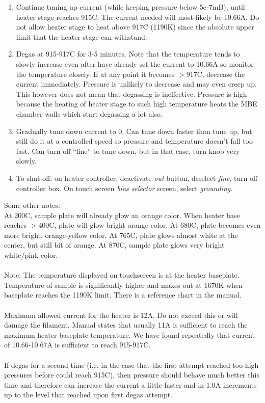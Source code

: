 \begin{enumerate}
\item	Continue tuning up current (while keeping pressure below 5e-7mB), until heater stage reaches 915C. The current needed will most-likely be 10.66A. Do not allow heater stage to heat above 917C (1190K) since the absolute upper limit that the heater stage can withstand. 
\item	Degas at 915-917C for 3-5 minutes. Note that the temperature tends to slowly increase even after have already set the current to 10.66A so monitor the temperature closely. If at any point it becomes $>917$C, decrease the current immediately. Pressure is unlikely to decrease and may even creep up. This however does not mean that degassing is ineffective. Pressure is high because the heating of heater stage to such high temperature heats the MBE chamber walls which start degassing a lot also.
\item	Gradually tune down current to 0. Can tune down faster than tune up, but still do it at a controlled speed so pressure and temperature doesn’t fall too fast. Can turn off “fine” to tune down, but in that case, turn knob very slowly.
\item	To shut-off: on heater controller, deactivate \emph{out} button, deselect \emph{fine}, turn off controller box. On touch screen \emph{bias selector} screen, select \emph{grounding}.
\end{enumerate}
Some other notes:\\
At 200C, sample plate will already glow an orange color. When heater base reaches $>400$C, plate will glow bright orange color. At 680C, plate becomes even more bright, orange-yellow color. At 765C, plate glows almost white at the center, but still bit of orange. At 870C, sample plate glows very bright white/pink color.\\\\
Note: The temperature displayed on touchscreen is at the heater baseplate. Temperature of sample is significantly higher and maxes out at 1670K when baseplate reaches the 1190K limit. There is a reference chart in the manual.\\\\
Maximum allowed current for the heater is 12A. Do not exceed this or will damage the filament. Manual states that usually 11A is sufficient to reach the maximum heater baseplate temperature. We have found repeatedly that current of 10.66-10.67A is sufficient to reach 915-917C.\\\\
If degas for a second time (i.e. in the case that the first attempt reached too high pressures before could reach 915C), then pressure should behave much better this time and therefore can increase the current a little faster and in 1.0A increments up to the level that reached upon first degas attempt.

